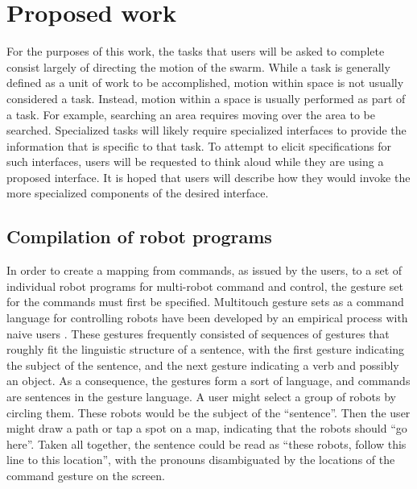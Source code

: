 \chapter{Proposed work}

For the purposes of this work, the tasks that users will be asked to complete consist largely of directing the motion of the swarm. 
While a task is generally defined as a unit of work to be accomplished, motion within space is not usually considered a task. 
Instead, motion within a space is usually performed as part of a task.
For example, searching an area requires moving over the area to be searched.
Specialized tasks will likely require specialized interfaces to provide the information that is specific to that task. 
To attempt to elicit specifications for such interfaces, users will be requested to think aloud while they are using a proposed interface. 
It is hoped that users will describe how they would invoke the more specialized components of the desired interface. 

\section{Compilation of robot programs}

In order to create a mapping from commands, as issued by the users, to a set of individual robot programs for multi-robot command and control, the gesture set for the commands must first be specified. 
Multitouch gesture sets as a command language for controlling robots have been developed by an empirical process with naive users \citep{Micire:2009:ANG:1731903.1731912}. 
These gestures frequently consisted of sequences of gestures that roughly fit the linguistic structure of a sentence, with the first gesture indicating the subject of the sentence, and the next gesture indicating a verb and possibly an object. 
As a consequence, the gestures form a sort of language, and commands are sentences in the gesture language.
A user might select a group of robots by circling them. 
These robots would be the subject of the ``sentence''.
Then the user might draw a path or tap a spot on a map, indicating that the robots should ``go here''. 
Taken all together, the sentence could be read as ``these robots, follow this line to this location'', with the pronouns disambiguated by the locations of the command gesture on the screen.

